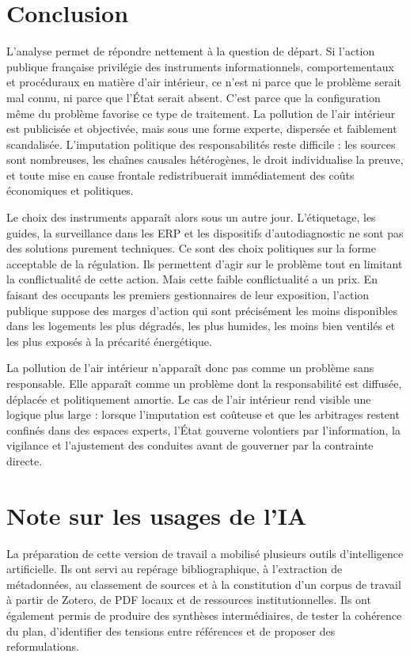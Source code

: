 \documentclass[a4paper,12pt,twoside]{book}
\begin{document}
\chapter{Conclusion}

L'analyse permet de répondre nettement à la question de départ. Si l'action publique française privilégie des instruments informationnels, comportementaux et procéduraux en matière d'air intérieur, ce n'est ni parce que le problème serait mal connu, ni parce que l'État serait absent. C'est parce que la configuration même du problème favorise ce type de traitement. La pollution de l'air intérieur est publicisée et objectivée, mais sous une forme experte, dispersée et faiblement scandalisée. L'imputation politique des responsabilités reste difficile : les sources sont nombreuses, les chaînes causales hétérogènes, le droit individualise la preuve, et toute mise en cause frontale redistribuerait immédiatement des coûts économiques et politiques.

Le choix des instruments apparaît alors sous un autre jour. L'étiquetage, les guides, la surveillance dans les ERP et les dispositifs d'autodiagnostic ne sont pas des solutions purement techniques. Ce sont des choix politiques sur la forme acceptable de la régulation. Ils permettent d'agir sur le problème tout en limitant la conflictualité de cette action. Mais cette faible conflictualité a un prix. En faisant des occupants les premiers gestionnaires de leur exposition, l'action publique suppose des marges d'action qui sont précisément les moins disponibles dans les logements les plus dégradés, les plus humides, les moins bien ventilés et les plus exposés à la précarité énergétique.

La pollution de l'air intérieur n'apparaît donc pas comme un problème sans responsable. Elle apparaît comme un problème dont la responsabilité est diffusée, déplacée et politiquement amortie. Le cas de l'air intérieur rend visible une logique plus large : lorsque l'imputation est coûteuse et que les arbitrages restent confinés dans des espaces experts, l'État gouverne volontiers par l'information, la vigilance et l'ajustement des conduites avant de gouverner par la contrainte directe.

\chapter*{Note sur les usages de l'IA}

La préparation de cette version de travail a mobilisé plusieurs outils d'intelligence artificielle. Ils ont servi au repérage bibliographique, à l'extraction de métadonnées, au classement de sources et à la constitution d'un corpus de travail à partir de Zotero, de PDF locaux et de ressources institutionnelles. Ils ont également permis de produire des synthèses intermédiaires, de tester la cohérence du plan, d'identifier des tensions entre références et de proposer des reformulations.
\end{document}
